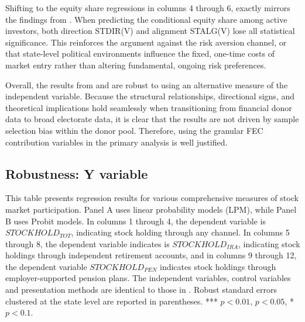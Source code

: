 Shifting to the equity share regressions in columns 4 through 6,  exactly mirrors the findings from . When predicting the conditional equity share among active investors, both direction STDIR(V) and alignment STALG(V) lose all statistical significance. This reinforces the argument against the risk aversion channel, or that state-level political environments influence the fixed, one-time costs of market entry rather than altering fundamental, ongoing risk preferences.

Overall, the results from  and  are robust to using an alternative measure of the independent variable. Because the structural relationships, directional signs, and theoretical implications hold seamlessly when transitioning from financial donor data to broad electorate data, it is clear that the results are not driven by sample selection bias within the donor pool. Therefore, using the granular FEC contribution variables in the primary analysis is well justified. 


\subsection{Robustness: Y variable}
\label{sec:robust_y}

\begin{table}
    \centering
    \caption{Comprehensive Stock Market Participation Variations}
    \label{tab:6}

    \begin{minipage}{\textheight}
        \small This table presents regression results for various comprehensive measures of stock market participation. Panel A uses linear probability models (LPM), while Panel B uses Probit models. In columns 1 through 4, the dependent variable is $STOCKHOLD_{TOT}$, indicating stock holding through any channel. In columns 5 through 8, the dependent variable indicates is $STOCKHOLD_{IRA}$, indicating stock holdings through independent retirement accounts, and in columns 9 through 12, the dependent variable $STOCKHOLD_{PEN}$ indicates stock holdings through employer-supported pension plans. The independent variables, control variables and presentation methods are identical to those in . Robust standard errors clustered at the state level are reported in parentheses. *** $p<0.01$,  $p<0.05$, * $p<0.1$.  
    \end{minipage}
    
    \footnotesize 
    
    \begin{subtable}{\linewidth}
        \caption{Linear Probability Model (LPM)}
        \label{tab:6a}
        
    \end{subtable}
\end{table}

